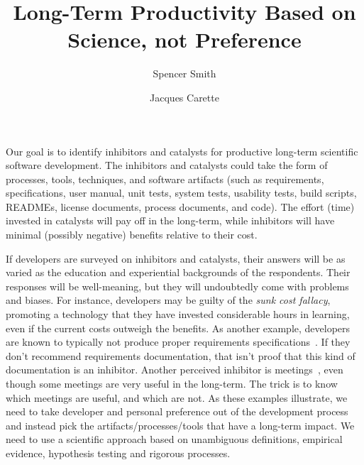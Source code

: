 \documentclass[sigconf, authorversion, nonacm]{acmart}
\begin{document}
\title{Long-Term Productivity Based on Science, not Preference}

\author{Spencer Smith}

\author{Jacques Carette}

\maketitle

Our goal is to identify inhibitors and catalysts for productive long-term
scientific software development.  The inhibitors and catalysts could take the
form of processes, tools, techniques, and software artifacts (such as
requirements, specifications, user manual, unit tests, system tests, usability
tests, build scripts, READMEs, license documents, process documents, and code).
The effort (time) invested in catalysts will pay off in the long-term, while 
inhibitors will have minimal (possibly negative) benefits relative to their
cost.

If developers are surveyed on inhibitors and catalysts, their answers will be as
varied as the education and experiential backgrounds of the respondents. Their
responses will be well-meaning, but they will undoubtedly come with problems and
biases.  For instance, developers may be guilty of the \emph{sunk cost fallacy},
promoting a technology that they have invested considerable hours in learning,
even if the current costs outweigh the benefits. As another example, developers
are known to typically not produce proper requirements
specifications~\cite{HeatonAndCarver2015}. If they don't recommend requirements
documentation, that isn't proof that this kind of documentation is an inhibitor.
Another perceived inhibitor is meetings~\cite{cite}, even though some meetings
are very useful in the long-term.  The trick is to know which meetings are
useful, and which are not.  As these examples illustrate, we need to take
developer and personal preference out of the development process and instead
pick the artifacts/processes/tools that have a long-term impact.  We need to use
a scientific approach based on unambiguous definitions, empirical evidence,
hypothesis testing and rigorous processes.
\end{document}
